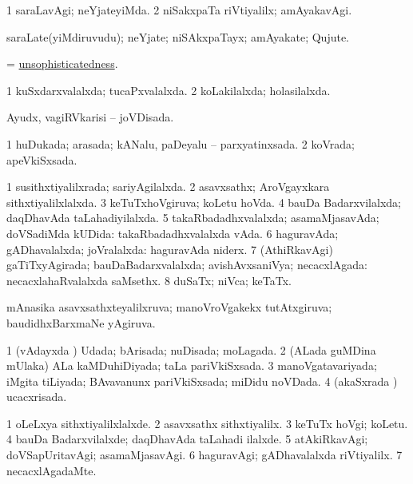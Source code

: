 \bentry
{} 
\gl{\kirxvi}
\expl{}
\bmng
\bnum
\num{1} saraLavAgi; neYjateyiMda. 
\num{2} niSakxpaTa riVtiyalilx; amAyakavAgi. 
\enum
\emng
\eentry

\bentry
{} 
\gl{\nA}
\expl{}
\bmng
saraLate(yiMdiruvudu); neYjate; niSAkxpaTayx; amAyakate; Qujute. 
\emng
\eentry

\bentry
{} 
\gl{\nA}
\expl{}
\bmng
= \hyperlink{unsophisticatedness}{unsophisticatedness}. 
\emng
\eentry

\bentry
{} 
\gl{\gu}
\expl{}
\bmng
\bnum
\num{1} kuSxdarxvalalxda; tucaPxvalalxda. 
\num{2} koLakilalxda; holasilalxda. 
\enum
\emng
\eentry

\bentry
{} 
\gl{\gu}
\expl{}
\bmng
Ayudx, vagiRVkarisi -- joVDisada. 
\emng
\eentry

\bentry
{} 
\gl{\gu}
\expl{}
\bmng
\bnum
\num{1} huDukada; arasada; kANalu, paDeyalu -- parxyatinxsada. 
\num{2} koVrada; apeVkiSxsada. 
\enum
\emng
\eentry

\bentry
{} 
\gl{\gu}
\expl{}
\bmng
\bnum
\num{1} susithxtiyalilxrada; sariyAgilalxda. 
\num{2} asavxsathx; AroVgayxkara sithxtiyalilxlalxda. 
\num{3} keTuTxhoVgiruva; koLetu hoVda. 
\num{4} bauDa Badarxvilalxda; daqDhavAda taLahadiyilalxda. 
\num{5} takaRbadadhxvalalxda; asamaMjasavAda; doVSadiMda kUDida:  takaRbadadhxvalalxda vAda. 
\num{6} haguravAda; gADhavalalxda; joVralalxda:  haguravAda niderx. 
\num{7} (AthiRkavAgi) gaTiTxyAgirada; bauDaBadarxvalalxda; avishAvxsaniVya; necacxlAgada:  necacxlahaRvalalxda saMsethx. 
\num{8} duSaTx; niVca; keTaTx. 
\enum
\emng

\noindent
\gl{\pagu}
\expl{}
\bmng
{} mAnasika asavxsathxteyalilxruva; manoVroVgakekx tutAtxgiruva; baudidhxBarxmaNe yAgiruva. 
\emng
\eentry

\bentry
{} 
\gl{\gu}
\expl{}
\bmng
\bnum
\num{1} (vAdayxda \vi) Udada; bArisada; nuDisada; moLagada. 
\num{2} (ALada guMDina mUlaka) ALa kaMDuhiDiyada; taLa pariVkiSxsada. 
\num{3} manoVgatavariyada; iMgita tiLiyada; BAvavanunx pariVkiSxsada; miDidu noVDada. 
\num{4} (akaSxrada \vi) ucacxrisada. 
\enum
\emng
\eentry

\bentry
{} 
\gl{\kirxvi}
\expl{}
\bmng
\bnum
\num{1} oLeLxya sithxtiyalilxlalxde. 
\num{2} asavxsathx sithxtiyalilx. 
\num{3} keTuTx hoVgi; koLetu. 
\num{4} bauDa Badarxvilalxde; daqDhavAda taLahadi ilalxde. 
\num{5} atAkiRkavAgi; doVSapUritavAgi; asamaMjasavAgi. 
\num{6} haguravAgi; gADhavalalxda riVtiyalilx. 
\num{7} necacxlAgadaMte. 
\enum
\emng
\eentry

